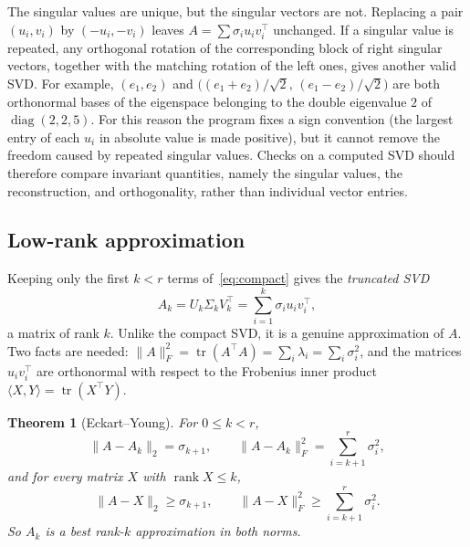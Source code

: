 \documentclass[12pt,a4paper]{report}
\newcommand{\norm}[1]{\lVert #1\rVert}
\newcommand{\T}{^{\top}}
\DeclareMathOperator{\rank}{rank}
\DeclareMathOperator{\diag}{diag}
\DeclareMathOperator{\tr}{tr}
\theoremstyle{plain}
\newtheorem{theorem}{Theorem}[chapter]
\theoremstyle{definition}
\theoremstyle{remark}
\theoremstyle{definition}
\begin{document}
The singular values are unique, but the singular vectors are not. Replacing a pair $(u_i,v_i)$ by $(-u_i,-v_i)$ leaves $A=\sum\sigma_iu_iv_i\T$ unchanged. If a singular value is repeated, any orthogonal rotation of the corresponding block of right singular vectors, together with the matching rotation of the left ones, gives another valid SVD. For example, $(e_1,e_2)$ and $\bigl((e_1+e_2)/\sqrt2,\,(e_1-e_2)/\sqrt2\bigr)$ are both orthonormal bases of the eigenspace belonging to the double eigenvalue $2$ of $\diag(2,2,5)$. For this reason the program fixes a sign convention (the largest entry of each $u_i$ in absolute value is made positive), but it cannot remove the freedom caused by repeated singular values. Checks on a computed SVD should therefore compare invariant quantities, namely the singular values, the reconstruction, and orthogonality, rather than individual vector entries.

\subsection{Low-rank approximation}\label{sec:eckartyoung}

Keeping only the first $k<r$ terms of~\eqref{eq:compact} gives the \emph{truncated SVD}
\[
A_k=U_k\Sigma_kV_k\T=\sum_{i=1}^k\sigma_iu_iv_i\T,
\]
a matrix of rank $k$. Unlike the compact SVD, it is a genuine approximation of $A$. Two facts are needed: $\norm{A}_F^2=\tr(A\T A)=\sum_i\lambda_i=\sum_i\sigma_i^2$, and the matrices $u_iv_i\T$ are orthonormal with respect to the Frobenius inner product $\langle X,Y\rangle=\tr(X\T Y)$.

\begin{theorem}[Eckart--Young]\label{thm:ey}
For $0\le k<r$,
\[
\norm{A-A_k}_2=\sigma_{k+1},\qquad \norm{A-A_k}_F^2=\sum_{i=k+1}^r\sigma_i^2 ,
\]
and for every matrix $X$ with $\rank X\le k$,
\[
\norm{A-X}_2\ge\sigma_{k+1},\qquad \norm{A-X}_F^2\ge\sum_{i=k+1}^r\sigma_i^2 .
\]
So $A_k$ is a best rank-$k$ approximation in both norms.
\end{theorem}
\end{document}
